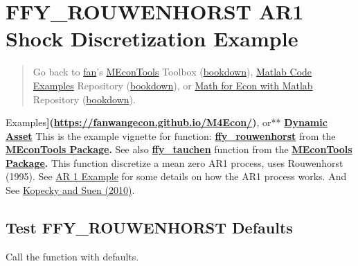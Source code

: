 \documentclass[
]{book}
\begin{document}
\hypertarget{ffy_rouwenhorst-ar1-shock-discretization-example}{%
\section{FFY\_ROUWENHORST AR1 Shock Discretization Example}\label{ffy_rouwenhorst-ar1-shock-discretization-example}}

\begin{quote}
Go back to \href{http://fanwangecon.github.io/}{fan}'s \href{https://fanwangecon.github.io/MEconTools/}{MEconTools} Toolbox (\href{https://fanwangecon.github.io/MEconTools/bookdown}{bookdown}), \href{https://fanwangecon.github.io/M4Econ/}{Matlab Code Examples} Repository (\href{https://fanwangecon.github.io/M4Econ/bookdown}{bookdown}), or \href{https://fanwangecon.github.io/Math4Econ/}{Math for Econ with Matlab} Repository (\href{https://fanwangecon.github.io/Math4Econ/bookdown}{bookdown}).
\end{quote}

Examples\textbf{{]}(\url{https://fanwangecon.github.io/M4Econ/})}, or** \href{https://fanwangecon.github.io/CodeDynaAsset/}{\textbf{Dynamic
Asset}}
This is the example vignette for function:
\href{https://github.com/FanWangEcon/MEconTools/blob/master/MEconTools/external/stats/ffy_rouwenhorst.m}{\textbf{ffy\_rouwenhorst}}
from the \href{https://fanwangecon.github.io/MEconTools/}{\textbf{MEconTools
Package}}\textbf{.} See also
\href{https://github.com/FanWangEcon/MEconTools/blob/master/MEconTools/external/stats/ffy_tauchen.m}{\textbf{ffy\_tauchen}}
function from the \href{https://fanwangecon.github.io/MEconTools/}{\textbf{MEconTools
Package}}\textbf{.} This function
discretize a mean zero AR1 process, uses Rouwenhorst (1995). See \href{https://fanwangecon.github.io/M4Econ/panel/timeseries/htmlpdfm/fs_autoregressive.html}{AR 1
Example}
for some details on how the AR1 process works. And See \href{https://doi.org/10.1016/j.red.2010.02.002}{Kopecky and Suen
(2010)}.

\hypertarget{test-ffy_rouwenhorst-defaults}{%
\subsection{Test FFY\_ROUWENHORST Defaults}\label{test-ffy_rouwenhorst-defaults}}

Call the function with defaults.
\end{document}
